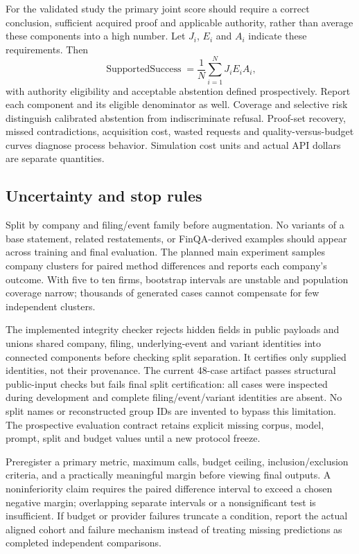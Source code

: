\documentclass[11pt]{article}
\begin{document}
For the validated study the primary joint score should require a correct conclusion, sufficient acquired proof and applicable authority, rather than average these components into a high number. Let $J_i$, $E_i$ and $A_i$ indicate these requirements. Then
\[
 \operatorname{SupportedSuccess}=\frac1N\sum_{i=1}^N J_i E_i A_i,
\]
with authority eligibility and acceptable abstention defined prospectively. Report each component and its eligible denominator as well. Coverage and selective risk distinguish calibrated abstention from indiscriminate refusal. Proof-set recovery, missed contradictions, acquisition cost, wasted requests and quality-versus-budget curves diagnose process behavior. Simulation cost units and actual API dollars are separate quantities.

\subsection{Uncertainty and stop rules}
Split by company and filing/event family before augmentation. No variants of a base statement, related restatements, or FinQA-derived examples should appear across training and final evaluation. The planned main experiment samples company clusters for paired method differences and reports each company's outcome. With five to ten firms, bootstrap intervals are unstable and population coverage narrow; thousands of generated cases cannot compensate for few independent clusters.

The implemented integrity checker rejects hidden fields in public payloads and unions shared company, filing, underlying-event and variant identities into connected components before checking split separation. It certifies only supplied identities, not their provenance. The current 48-case artifact passes structural public-input checks but fails final split certification: all cases were inspected during development and complete filing/event/variant identities are absent. No split names or reconstructed group IDs are invented to bypass this limitation. The prospective evaluation contract retains explicit missing corpus, model, prompt, split and budget values until a new protocol freeze.

Preregister a primary metric, maximum calls, budget ceiling, inclusion/exclusion criteria, and a practically meaningful margin before viewing final outputs. A noninferiority claim requires the paired difference interval to exceed a chosen negative margin; overlapping separate intervals or a nonsignificant test is insufficient. If budget or provider failures truncate a condition, report the actual aligned cohort and failure mechanism instead of treating missing predictions as completed independent comparisons.
\end{document}
